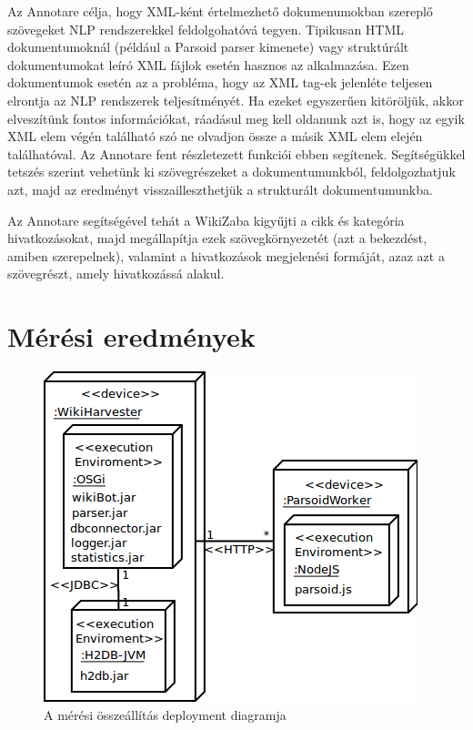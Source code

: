 Az Annotare célja, hogy XML-ként értelmezhető dokumenumokban szereplő szövegeket NLP rendszerekkel feldolgohatóvá tegyen. Tipikusan HTML dokumentumoknál (például a Parsoid parser kimenete) vagy struktúrált dokumentumokat leíró XML fájlok esetén hasznos az alkalmazása. Ezen dokumentumok esetén az a probléma, hogy az XML tag-ek jelenléte teljesen elrontja az NLP rendszerek teljesítményét. Ha ezeket egyszerűen kitöröljük, akkor elveszítünk fontos információkat, ráadásul meg kell oldanunk azt is, hogy az egyik XML elem végén található szó ne olvadjon össze a másik XML elem elején találhatóval. Az Annotare fent részletezett funkciói ebben segítenek. Segítségükkel tetszés szerint vehetünk ki szövegrészeket a dokumentumunkból, feldolgozhatjuk azt, majd az eredményt visszailleszthetjük a strukturált dokumentumunkba.

Az Annotare segítségével tehát a WikiZaba kigyűjti a cikk és kategória hivatkozásokat, majd megállapítja ezek szövegkörnyezetét (azt a bekezdést, amiben szerepelnek), valamint a hivatkozások megjelenési formáját, azaz azt a szövegrészt, amely hivatkozássá alakul. 


\section{Mérési eredmények}
\label{sec:measurement}

\begin{figure}[htp]
\centering
\includegraphics[scale=0.55]{img/deploymentdiagram}
\caption{A mérési összeállítás deployment diagramja}
\label{fig:deploymentdiagram}
\end{figure}

